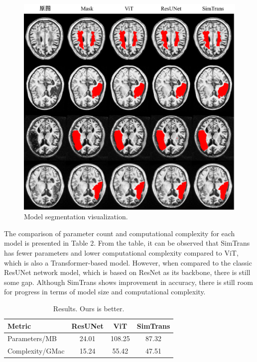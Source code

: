 \documentclass[10pt,twocolumn,letterpaper]{article}
\begin{document}
\begin{figure}
  \begin{center}
  \includegraphics{Images/Results.png}
  \end{center}
     \caption{Model segmentation visualization.}
  \label{fig:result}
\end{figure}

The comparison of parameter count and computational complexity for each model is presented in Table 2. From the table, it can be observed that SimTrans has fewer parameters and lower computational complexity compared to ViT, which is also a Transformer-based model. However, when compared to the classic ResUNet network model, which is based on ResNet as its backbone, there is still some gap. Although SimTrans shows improvement in accuracy, there is still room for progress in terms of model size and computational complexity.

\begin{table}
  \centering
  \begin{tabular}{lccc}
    \toprule
    Metric & ResUNet & ViT & SimTrans \\
    \midrule
    Parameters/MB & 24.01 & 108.25 & 87.32 \\
    Complexity/GMac & 15.24 & 55.42 & 47.51 \\
    \bottomrule
  \end{tabular}
  \caption{Results.   Ours is better.}
  \label{tab:result_2}
\end{table}
\end{document}
